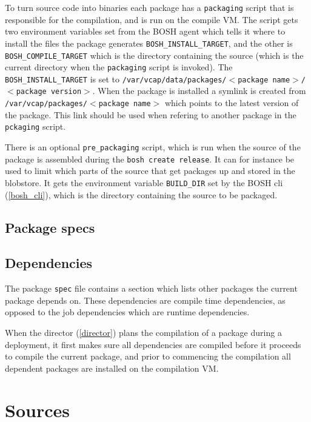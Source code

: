 To turn source code into binaries each package has a \texttt{packaging} script that is responsible for the compilation, and is run on the compile VM. The script gets two environment variables set from the BOSH agent which tells it where to install the files the package generates \texttt{BOSH\_INSTALL\_TARGET}, and the other is \texttt{BOSH\_COMPILE\_TARGET} which is the directory containing the source (which is the current directory when the \texttt{packaging} script is invoked). The \texttt{BOSH\_INSTALL\_TARGET} is set to \texttt{\slash var\slash vcap\slash data\slash packages\slash $<$package name$>$\slash $<$package version$>$}. When the package is installed a symlink is created from \texttt{\slash var\slash vcap\slash packages\slash $<$package name$>$} which points to the latest version of the package. This link should be used when refering to another package in the \texttt{pckaging} script.

There is an optional \texttt{pre\_packaging} script, which is run when the source of the package is assembled during the \texttt{bosh create release}. It can for instance be used to limit which parts of the source that get packages up and stored in the blobstore. It gets the environment variable \texttt{BUILD\_DIR} set by the BOSH cli (\autoref{bosh_cli}), which is the directory containing the source to be packaged.

\subsection{Package specs}
\label{packagespecs}

\subsection{Dependencies}
\label{dependencies}

The package \texttt{spec} file contains a section which lists other packages the current package depends on. These dependencies are compile time dependencies, as opposed to the job dependencies which are runtime dependencies.

When the director (\autoref{director}) plans the compilation of a package during a deployment, it first makes sure all dependencies are compiled before it proceeds to compile the current package, and prior to commencing the compilation all dependent packages are installed on the compilation VM.

\section{Sources}
\label{sources}

